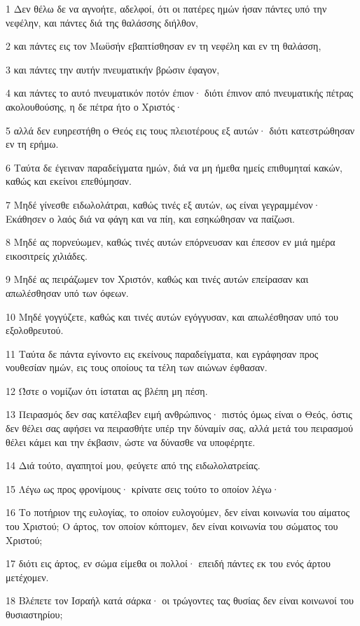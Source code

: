 \par 1 Δεν θέλω δε να αγνοήτε, αδελφοί, ότι οι πατέρες ημών ήσαν πάντες υπό την νεφέλην, και πάντες διά της θαλάσσης διήλθον,
\par 2 και πάντες εις τον Μωϋσήν εβαπτίσθησαν εν τη νεφέλη και εν τη θαλάσση,
\par 3 και πάντες την αυτήν πνευματικήν βρώσιν έφαγον,
\par 4 και πάντες το αυτό πνευματικόν ποτόν έπιον· διότι έπινον από πνευματικής πέτρας ακολουθούσης, η δε πέτρα ήτο ο Χριστός·
\par 5 αλλά δεν ευηρεστήθη ο Θεός εις τους πλειοτέρους εξ αυτών· διότι κατεστρώθησαν εν τη ερήμω.
\par 6 Ταύτα δε έγειναν παραδείγματα ημών, διά να μη ήμεθα ημείς επιθυμηταί κακών, καθώς και εκείνοι επεθύμησαν.
\par 7 Μηδέ γίνεσθε ειδωλολάτραι, καθώς τινές εξ αυτών, ως είναι γεγραμμένον· Εκάθησεν ο λαός διά να φάγη και να πίη, και εσηκώθησαν να παίζωσι.
\par 8 Μηδέ ας πορνεύωμεν, καθώς τινές αυτών επόρνευσαν και έπεσον εν μιά ημέρα εικοσιτρείς χιλιάδες.
\par 9 Μηδέ ας πειράζωμεν τον Χριστόν, καθώς και τινές αυτών επείρασαν και απωλέσθησαν υπό των όφεων.
\par 10 Μηδέ γογγύζετε, καθώς και τινές αυτών εγόγγυσαν, και απωλέσθησαν υπό του εξολοθρευτού.
\par 11 Ταύτα δε πάντα εγίνοντο εις εκείνους παραδείγματα, και εγράφησαν προς νουθεσίαν ημών, εις τους οποίους τα τέλη των αιώνων έφθασαν.
\par 12 Ώστε ο νομίζων ότι ίσταται ας βλέπη μη πέση.
\par 13 Πειρασμός δεν σας κατέλαβεν ειμή ανθρώπινος· πιστός όμως είναι ο Θεός, όστις δεν θέλει σας αφήσει να πειρασθήτε υπέρ την δύναμίν σας, αλλά μετά του πειρασμού θέλει κάμει και την έκβασιν, ώστε να δύνασθε να υποφέρητε.
\par 14 Διά τούτο, αγαπητοί μου, φεύγετε από της ειδωλολατρείας.
\par 15 Λέγω ως προς φρονίμους· κρίνατε σεις τούτο το οποίον λέγω·
\par 16 Το ποτήριον της ευλογίας, το οποίον ευλογούμεν, δεν είναι κοινωνία του αίματος του Χριστού; Ο άρτος, τον οποίον κόπτομεν, δεν είναι κοινωνία του σώματος του Χριστού;
\par 17 διότι εις άρτος, εν σώμα είμεθα οι πολλοί· επειδή πάντες εκ του ενός άρτου μετέχομεν.
\par 18 Βλέπετε τον Ισραήλ κατά σάρκα· οι τρώγοντες τας θυσίας δεν είναι κοινωνοί του θυσιαστηρίου;
